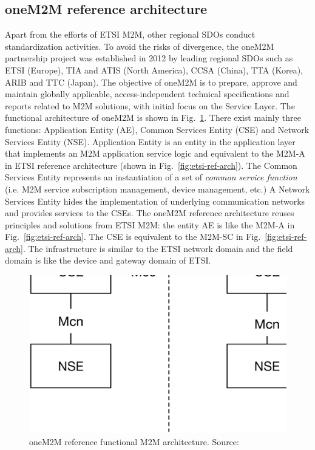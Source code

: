 \subsection{oneM2M reference architecture}
Apart from the efforts of ETSI M2M, other regional SDOs conduct standardization activities. To avoid the risks of divergence,  the oneM2M partnership project was established in 2012 by leading regional SDOs such as ETSI (Europe), TIA and ATIS (North America), CCSA (China), TTA (Korea), ARIB and TTC (Japan). The objective of oneM2M is to prepare, approve and maintain globally applicable, access-independent technical specifications and reports related to M2M solutions, with initial focus on the Service Layer. The functional architecture of oneM2M is shown in Fig.~\ref{fig:onem2m-ref-arch}. There exist mainly three functions: Application Entity (AE), Common Services Entity (CSE) and Network Services Entity (NSE). Application Entity is an entity in the application layer that implements an M2M application service logic and equivalent to the M2M-A in ETSI reference architecture (shown in Fig.~\ref{fig:etsi-ref-arch}). The Common Services Entity represents an instantiation of a set of \emph{common service function} (i.e. M2M service
subscription management,  device management, etc.)
A Network Services Entity hides the implementation of underlying communication networks and  provides services to the CSEs. The oneM2M reference architecture reuses principles and solutions from ETSI M2M: the entity AE is like the M2M-A in Fig.~\ref{fig:etsi-ref-arch}. The CSE is equivalent to the M2M-SC in Fig.~\ref{fig:etsi-ref-arch}. The infrastructure is similar to the ETSI network domain and the field domain is like the device and gateway domain of ETSI.
\begin{figure}[!t]
	\centering
	\includegraphics[width=0.8\linewidth]{Chapter2/Figures/oneM2M-reference-architecture}
	\caption{oneM2M reference functional M2M architecture. Source: \cite{onem2m/funcarch}}
	\label{fig:onem2m-ref-arch}
\end{figure}
